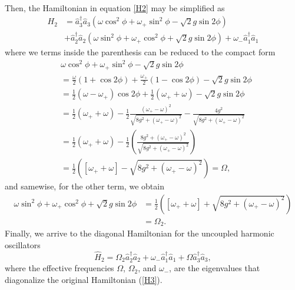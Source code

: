 \documentclass{article}
\newcommand{\op}[1]{\hat{#1}}
\begin{document}
Then, the Hamiltonian in equation \eqref{H2} may be simplified  as
\begin{equation}\label{H2r}
\begin{aligned}
    H_{2} &= \op{a}_{3}^{\dagger}\op{a}_{3}(\omega\cos^{2}\phi + \omega_{+}\sin^{2}\phi - \sqrt{2}g\sin2\phi)\\
    &+ \op{a}_{2}^{\dagger}\op{a}_{2}(\omega\sin^{2}\phi + \omega_{+}\cos^{2}\phi + \sqrt{2}g\sin2\phi) + \omega_{-}\op{a}_{1}^{\dagger}\op{a}_{1}
\end{aligned}
\end{equation}
where we terms inside the parenthesis can be reduced to the compact form
\begin{align*}
    &\omega\cos^{2}\phi+\omega_{+}\sin^{2}\phi-\sqrt{2}g\sin2\phi\\
    &= \frac{\omega}{2}\left(1+\cos2\phi\right)+\frac{\omega_{+}}{2}\left(1-\cos2\phi\right)-\sqrt{2}g\sin2\phi\\
    &= \frac{1}{2}\left(\omega-\omega_{+}\right)\cos2\phi + \frac{1}{2}\left(\omega_{+} + \omega\right) - \sqrt{2}g\sin2\phi\\
    &= \frac{1}{2}\left(\omega_{+} + \omega\right) - \frac{1}{2}\frac{\left(\omega_{+} - \omega\right)^{2}}{\sqrt{8g^{2}+\left(\omega_{+} - \omega\right)^{2}}} - \frac{4g^{2}}{\sqrt{8g^{2}+\left(\omega_{+} - \omega\right)^{2}}}\\
    &= \frac{1}{2}\left(\omega_{+} + \omega\right) - \frac{1}{2}\left(\frac{8g^{2}+\left(\omega_{+} - \omega\right)^{2}}{\sqrt{8g^{2}+\left(\omega_{+} - \omega\right)^{2}}}\right)\\
    &= \frac{1}{2}\left(\left[\omega_{+} + \omega\right] - \sqrt{8g^{2}+\left(\omega_{+} - \omega\right)^{2}}\right) = \Omega,
\end{align*}
and samewise, for the other term, we obtain
\begin{align*}
    \omega\sin^{2}\phi+\omega_{+}\cos^{2}\phi + \sqrt{2}g\sin2\phi &=
     \frac{1}{2}\left(\left[\omega_{+} + \omega\right] +\sqrt{8g^{2}+\left(\omega_{+} - \omega\right)^{2}}\right)\\ &= \Omega_{2}.
\end{align*}
Finally, we arrive to the diagonal Hamiltonian for the uncoupled harmonic oscillators
\begin{equation}\label{H2D}
    \op{H}_{2} = \Omega_{2} \op{a}^{\dagger}_{2}\op{a}_{2} + \omega_{-}\op{a}^{\dagger}_{1}\op{a}_{1} + \Omega \op{a}_{3}^{\dagger}\op{a}_{3},
\end{equation}
where the effective frequencies $\Omega$, $\Omega_{2}$, and $\omega_{-}$, are the eigenvalues that diagonalize the original Hamiltonian (\ref{H3}).
\end{document}
